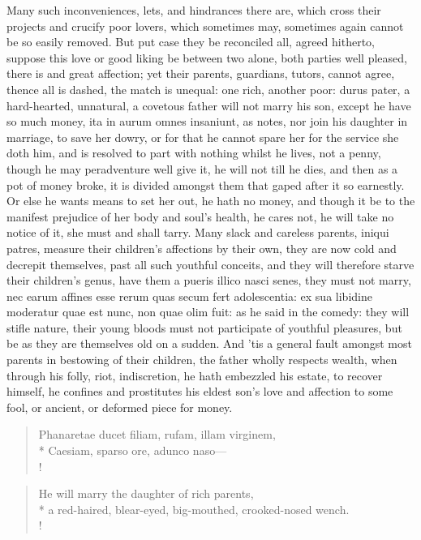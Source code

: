 Many such inconveniences, lets, and hindrances there are, which cross
their projects and crucify poor lovers, which sometimes may, sometimes
again cannot be so easily removed. But put case they be reconciled all,
agreed hitherto, suppose this love or good liking be between two alone,
both parties well pleased, there is  and great
affection; yet their parents, guardians, tutors, cannot agree, thence
all is dashed, the match is unequal: one rich, another poor: durus
pater, a hard-hearted, unnatural, a covetous father will not marry his
son, except he have so much money, ita in aurum omnes insaniunt, as
\Chrysostom{} notes, nor join his daughter in marriage, to save her
dowry, or for that he cannot spare her for the service she doth him,
and is resolved to part with nothing whilst he lives, not a penny,
though he may peradventure well give it, he will not till he dies, and
then as a pot of money broke, it is divided amongst them that gaped
after it so earnestly. Or else he wants means to set her out, he hath
no money, and though it be to the manifest prejudice of her body and
soul's health, he cares not, he will take no notice of it, she must and
shall tarry. Many slack and careless parents, iniqui patres, measure
their children's affections by their own, they are now cold and
decrepit themselves, past all such youthful conceits, and they will
therefore starve their children's genus, have them a pueris 
illico nasci senes, they must not marry, nec earum affines esse rerum
quas secum fert adolescentia: ex sua libidine moderatur quae est nunc,
non quae olim fuit: as he said in the comedy: they will stifle nature,
their young bloods must not participate of youthful pleasures, but be
as they are themselves old on a sudden. And 'tis a general fault
amongst most parents in bestowing of their children, the father wholly
respects wealth, when through his folly, riot, indiscretion, he hath
embezzled his estate, to recover himself, he confines and prostitutes
his eldest son's love and affection to some fool, or ancient, or
deformed piece for money.
%
\begin{latin}
\begin{verse}%
Phanaretae ducet filiam, rufam, illam virginem,\\*
Caesiam, sparso ore, adunco naso---\\!
\end{verse}%
\end{latin}
\translationrule%
\begin{verse}%
He will marry the daughter of rich parents,\\*
a red-haired, blear-eyed, big-mouthed, crooked-nosed wench.\\!
\end{verse}%
%

